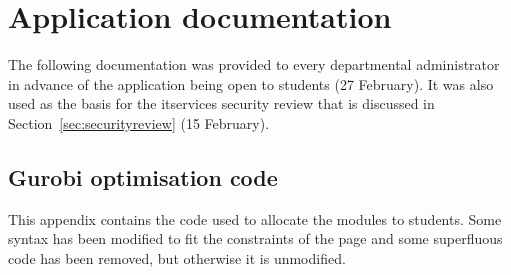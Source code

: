 \documentclass[twoside,draft]{scrartcl}
\let\stdsection\section
\renewcommand\section{\clearpage\stdsection}
\begin{document}
\clearpage

\stdsection{Application documentation}
\label{sec:documentation}

The following documentation was provided to every departmental administrator
in advance of the application being open to students (27 February). It was
also used as the basis for the \gls{itservices} security review that is
discussed in Section~\ref{sec:securityreview} (15 February).




\begin{landscape}
  \stdsection{Gurobi optimisation code}
  \label{sec:gurobicode}
  
  This appendix contains the code used to allocate the modules to students. Some
  syntax has been modified to fit the constraints of the page and some
  superfluous code has been removed, but otherwise it is unmodified.
  
  
\end{landscape}

\clearpage
\printglossaries

\clearpage

\end{document}
